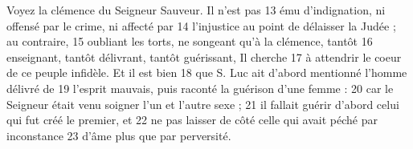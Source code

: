 Voyez la clémence du Seigneur Sauveur. Il n'est pas	 
13	 	ému d'indignation, ni offensé par le crime, ni affecté par	 
14	 	l'injustice au point de délaisser la Judée ; au contraire,	 
15	 	oubliant les torts, ne songeant qu'à la clémence, tantôt	 
16	 	enseignant, tantôt délivrant, tantôt guérissant, Il cherche	 
17	 	à attendrir le coeur de ce peuple infidèle. Et il est bien	 
18	 	que S. Luc ait d'abord mentionné l'homme délivré de	 
19	 	l'esprit mauvais, puis raconté la guérison d'une femme :	 
20	 	car le Seigneur était venu soigner l'un et l'autre sexe ;	 
21	 	il fallait guérir d'abord celui qui fut créé le premier, et	 
22	 	ne pas laisser de côté celle qui avait péché par inconstance	 
23	 	d'âme plus que par perversité.